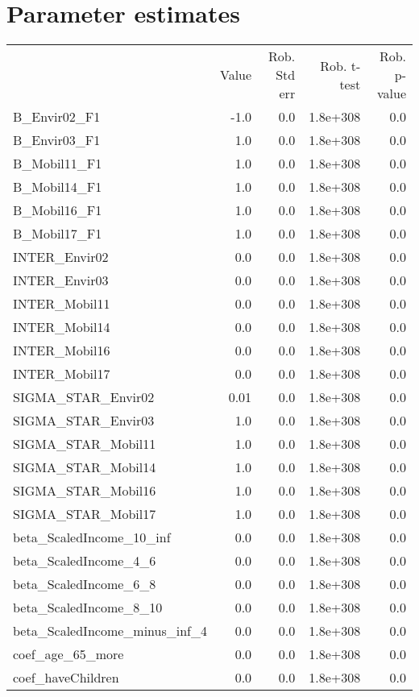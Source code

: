 \section{Parameter estimates}
\begin{tabular}{lrrrr}
 & Value & Rob. Std err & Rob. t-test & Rob. p-value \\
B_Envir02_F1 & -1.0 & 0.0 & 1.8e+308 & 0.0 \\
B_Envir03_F1 & 1.0 & 0.0 & 1.8e+308 & 0.0 \\
B_Mobil11_F1 & 1.0 & 0.0 & 1.8e+308 & 0.0 \\
B_Mobil14_F1 & 1.0 & 0.0 & 1.8e+308 & 0.0 \\
B_Mobil16_F1 & 1.0 & 0.0 & 1.8e+308 & 0.0 \\
B_Mobil17_F1 & 1.0 & 0.0 & 1.8e+308 & 0.0 \\
INTER_Envir02 & 0.0 & 0.0 & 1.8e+308 & 0.0 \\
INTER_Envir03 & 0.0 & 0.0 & 1.8e+308 & 0.0 \\
INTER_Mobil11 & 0.0 & 0.0 & 1.8e+308 & 0.0 \\
INTER_Mobil14 & 0.0 & 0.0 & 1.8e+308 & 0.0 \\
INTER_Mobil16 & 0.0 & 0.0 & 1.8e+308 & 0.0 \\
INTER_Mobil17 & 0.0 & 0.0 & 1.8e+308 & 0.0 \\
SIGMA_STAR_Envir02 & 0.01 & 0.0 & 1.8e+308 & 0.0 \\
SIGMA_STAR_Envir03 & 1.0 & 0.0 & 1.8e+308 & 0.0 \\
SIGMA_STAR_Mobil11 & 1.0 & 0.0 & 1.8e+308 & 0.0 \\
SIGMA_STAR_Mobil14 & 1.0 & 0.0 & 1.8e+308 & 0.0 \\
SIGMA_STAR_Mobil16 & 1.0 & 0.0 & 1.8e+308 & 0.0 \\
SIGMA_STAR_Mobil17 & 1.0 & 0.0 & 1.8e+308 & 0.0 \\
beta_ScaledIncome_10_inf & 0.0 & 0.0 & 1.8e+308 & 0.0 \\
beta_ScaledIncome_4_6 & 0.0 & 0.0 & 1.8e+308 & 0.0 \\
beta_ScaledIncome_6_8 & 0.0 & 0.0 & 1.8e+308 & 0.0 \\
beta_ScaledIncome_8_10 & 0.0 & 0.0 & 1.8e+308 & 0.0 \\
beta_ScaledIncome_minus_inf_4 & 0.0 & 0.0 & 1.8e+308 & 0.0 \\
coef_age_65_more & 0.0 & 0.0 & 1.8e+308 & 0.0 \\
coef_haveChildren & 0.0 & 0.0 & 1.8e+308 & 0.0 \\

\end{tabular}
